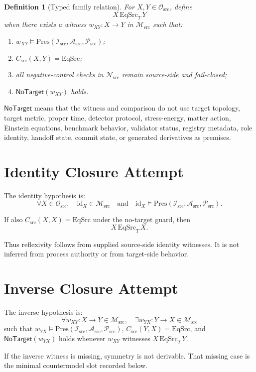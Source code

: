 \documentclass[11pt]{article}
\newcommand{\EqSrc}{\mathrm{EqSrc}}
\newcommand{\EqSrcT}{\mathrm{EqSrc}_{T}}
\newcommand{\Osrc}{\mathcal{O}_{\mathrm{src}}}
\newcommand{\Msrc}{\mathcal{M}_{\mathrm{src}}}
\newcommand{\Isrc}{\mathcal{I}_{\mathrm{src}}}
\newcommand{\Asrc}{\mathcal{A}_{\mathrm{src}}}
\newcommand{\Psrc}{\mathcal{P}_{\mathrm{src}}}
\newcommand{\Nsrc}{\mathcal{N}_{\mathrm{src}}}
\newcommand{\Csrc}{C_{\mathrm{src}}}
\newcommand{\NoTarget}{\mathsf{NoTarget}}
\newtheorem{definition}{Definition}
\begin{document}
\begin{definition}[Typed family relation]
For \(X,Y\in\Osrc\), define
\[
  X\,\EqSrcT\,Y
\]
when there exists a witness \(w_{XY}:X\to Y\) in \(\Msrc\) such that:
\begin{enumerate}[label=(\roman*)]
  \item \(w_{XY}\models \mathrm{Pres}(\Isrc,\Asrc,\Psrc)\);
  \item \(\Csrc(X,Y)=\EqSrc\);
  \item all negative-control checks in \(\Nsrc\) remain source-side and
  fail-closed;
  \item \(\NoTarget(w_{XY})\) holds.
\end{enumerate}
\end{definition}

\(\NoTarget\) means that the witness and comparison do not use target
topology, target metric, proper time, detector protocol, stress-energy,
matter action, Einstein equations, benchmark behavior, validator status,
registry metadata, role identity, handoff state, commit state, or generated
derivatives as premises.

\section{Identity Closure Attempt}

The identity hypothesis is:
\[
  \forall X\in\Osrc,\quad \mathrm{id}_{X}\in\Msrc
  \quad\text{and}\quad
  \mathrm{id}_{X}\models \mathrm{Pres}(\Isrc,\Asrc,\Psrc).
\]

If also \(\Csrc(X,X)=\EqSrc\) under the no-target guard, then
\[
  X\,\EqSrcT\,X.
\]

Thus reflexivity follows from supplied source-side identity witnesses. It is
not inferred from process authority or from target-side behavior.

\section{Inverse Closure Attempt}

The inverse hypothesis is:
\[
  \forall w_{XY}:X\to Y\in\Msrc,\quad
  \exists w_{YX}:Y\to X\in\Msrc
\]
such that \(w_{YX}\models \mathrm{Pres}(\Isrc,\Asrc,\Psrc)\),
\(\Csrc(Y,X)=\EqSrc\), and \(\NoTarget(w_{YX})\) holds whenever
\(w_{XY}\) witnesses \(X\,\EqSrcT\,Y\).

If the inverse witness is missing, symmetry is not derivable. That missing
case is the minimal countermodel slot recorded below.
\end{document}
